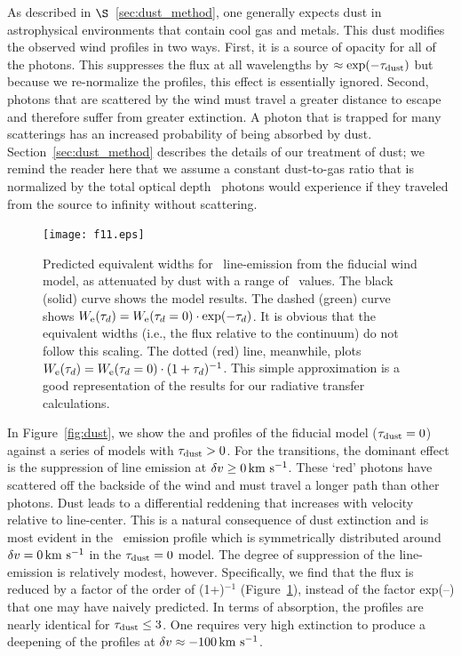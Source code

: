 \documentclass[]{emulateapj}
\begin{document}
As described in $\S$~\ref{sec:dust_method}, 
one generally expects dust in astrophysical environments that contain
cool gas and metals.  This dust 
modifies the observed wind profiles in two ways. 
First, it is a source of opacity for all of 
the photons.  This suppresses the flux at all
wavelengths by $\approx \exp(-\tau_{\rm dust})$ but because we re-normalize the
profiles, this effect is essentially ignored.  Second, photons that are
scattered by the wind must travel a greater
distance to escape and therefore suffer from greater extinction.  A photon that is
trapped for many scatterings %
has an increased 
probability of being absorbed
by dust.  
Section~\ref{sec:dust_method} describes the details of our treatment of dust; we 
remind the reader here that we assume a constant dust-to-gas ratio 
that is normalized by the total optical
depth \taud\ photons would experience if they traveled from the
source to infinity without scattering. 

\begin{figure}
\texttt{[image: f11.eps]}
\caption{
Predicted equivalent widths for \mgiib\ line-emission from the
fiducial wind model, as attenuated by dust with a range of \taud\
values.  
The black (solid) curve shows the model results.
The dashed (green) curve shows
$W_{\rm e}(\tau_d) = W_{\rm e}(\tau_d = 0) \cdot \exp(-\tau_d)$.
It is obvious that the equivalent widths (i.e., the flux relative to
the continuum) do not follow this scaling.
The dotted (red) line, meanwhile, plots $W_{\rm e}(\tau_d) = W_{\rm e}(\tau_d = 0)
\cdot (1+\tau_d)^{-1}$. 
This simple approximation is a good
representation of the results for our radiative transfer calculations.   
}
\label{fig:dust_tau}
\end{figure}


In Figure~\ref{fig:dust}, we show the  and 
profiles of the fiducial model ($\tau_{\rm dust} = 0$) against a series of
models with $\tau_{\rm dust} > 0$.  For the \ion{Mg}{2} transitions, the
dominant effect is the suppression of line emission at $\delta v \ge 0
\, {\rm km~s^{-1}}$.  These `red' photons have scattered off the
backside of the wind and must travel a longer path than other
photons.  Dust leads to a differential reddening that increases with 
velocity relative to line-center. This is a natural consequence of dust
extinction and is most evident in the \feiic\ 
emission profile which is symmetrically distributed around
$\delta v= 0 \, {\rm km~s^{-1}}$ in the $\tau_{\rm dust}=0$ model.   
The degree of suppression of the line-emission is relatively modest,
however.  Specifically, we find that the flux is reduced by a factor 
of the order of (1+\taud)$^{-1}$ (Figure~\ref{fig:dust_tau}),
instead of the factor
exp(--\taud) that one may have naively predicted. 
In terms of absorption, the profiles are
nearly identical for $\tau_{\rm dust} \le 3$.  One requires very high
extinction to %
produce a deepening of the profiles at 
$\delta v \approx -100 \, {\rm km~s^{-1}}$.
\end{document}
